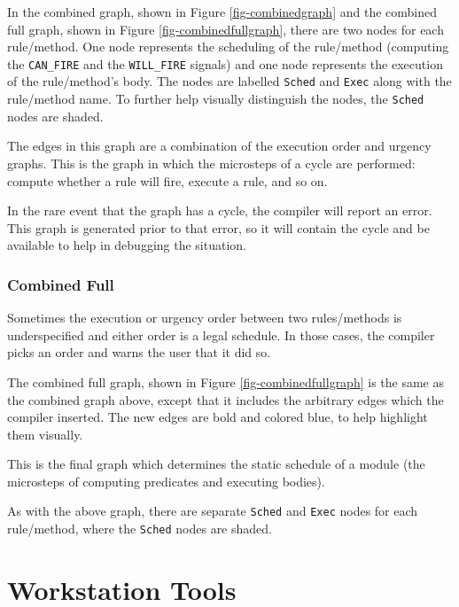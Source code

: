 \documentclass{article}
\newcommand{\te}[1]{\texttt{#1}}
\begin{document}
In the combined graph, shown in Figure \ref{fig-combinedgraph} and the
combined full graph, shown in Figure \ref{fig-combinedfullgraph},
 there are two nodes for each rule/method.
One node represents the scheduling of the rule/method (computing the
\te{CAN\_FIRE} and the \te{WILL\_FIRE} signals)
and one node represents the execution of the rule/method's body.  The
nodes are labelled \te{Sched} and \te{Exec} along with the
rule/method name. To further help visually distinguish the nodes, the
\te{Sched} nodes are shaded.

The edges in this graph are a combination of the execution order
and urgency graphs.  This is the graph in which the
microsteps of a cycle are performed: compute whether a rule will fire,
execute a rule, and so on.

In the rare event that the graph has a cycle, the compiler will report an error.
This graph is generated prior to that error, so it will contain the
cycle and be available to help in debugging the situation.


\subsubsection{Combined Full}

Sometimes the execution or urgency order between two rules/methods is
underspecified and either order is a legal schedule.  In those cases,
the compiler
picks an order and warns the user that it did so.

The combined full  graph, shown in Figure \ref{fig-combinedfullgraph} is the same as the combined graph above, except that it includes the
arbitrary edges which the compiler inserted.  The new edges are bold
and colored blue, to help highlight them visually.

This is the final graph which determines the static schedule of a module
(the microsteps of computing predicates and executing bodies).

As with the above graph, there are separate \te{Sched} and \te{Exec} nodes
for each rule/method, where the \te{Sched} nodes are shaded.


\section{Workstation Tools}
\end{document}

